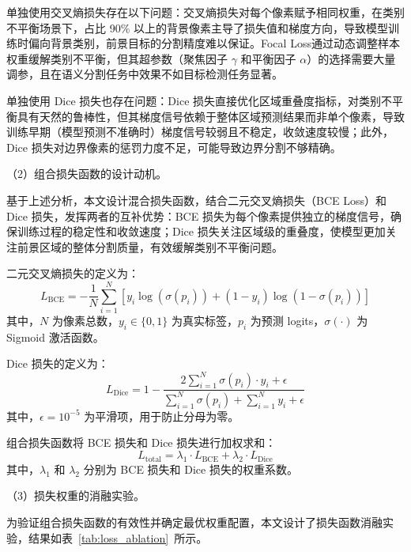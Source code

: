 单独使用交叉熵损失存在以下问题：交叉熵损失对每个像素赋予相同权重，在类别不平衡场景下，占比 90\% 以上的背景像素主导了损失值和梯度方向，导致模型训练时偏向背景类别，前景目标的分割精度难以保证。Focal Loss通过动态调整样本权重缓解类别不平衡，但其超参数（聚焦因子 $\gamma$ 和平衡因子 $\alpha$）的选择需要大量调参，且在语义分割任务中效果不如目标检测任务显著。

单独使用 Dice 损失也存在问题：Dice 损失直接优化区域重叠度指标，对类别不平衡具有天然的鲁棒性，但其梯度信号依赖于整体区域预测结果而非单个像素，导致训练早期（模型预测不准确时）梯度信号较弱且不稳定，收敛速度较慢；此外，Dice 损失对边界像素的惩罚力度不足，可能导致边界分割不够精确。

（2）组合损失函数的设计动机。

基于上述分析，本文设计混合损失函数，结合二元交叉熵损失（BCE Loss）和 Dice 损失，发挥两者的互补优势：BCE 损失为每个像素提供独立的梯度信号，确保训练过程的稳定性和收敛速度；Dice 损失关注区域级的重叠度，使模型更加关注前景区域的整体分割质量，有效缓解类别不平衡问题。

二元交叉熵损失的定义为：
\begin{equation}
L_{\text{BCE}} = -\frac{1}{N} \sum_{i=1}^{N} \left[ y_i \log(\sigma(p_i)) + (1-y_i) \log(1-\sigma(p_i)) \right]
\label{eq:bce_loss}
\end{equation}
其中，$N$ 为像素总数，$y_i \in \{0, 1\}$ 为真实标签，$p_i$ 为预测 logits，$\sigma(\cdot)$ 为 Sigmoid 激活函数。

Dice 损失的定义为：
\begin{equation}
L_{\text{Dice}} = 1 - \frac{2 \sum_{i=1}^{N} \sigma(p_i) \cdot y_i + \epsilon}{\sum_{i=1}^{N} \sigma(p_i) + \sum_{i=1}^{N} y_i + \epsilon}
\label{eq:dice_loss}
\end{equation}
其中，$\epsilon = 10^{-5}$ 为平滑项，用于防止分母为零。

组合损失函数将 BCE 损失和 Dice 损失进行加权求和：
\begin{equation}
L_{\text{total}} = \lambda_1 \cdot L_{\text{BCE}} + \lambda_2 \cdot L_{\text{Dice}}
\label{eq:total_loss}
\end{equation}
其中，$\lambda_1$ 和 $\lambda_2$ 分别为 BCE 损失和 Dice 损失的权重系数。

（3）损失权重的消融实验。

为验证组合损失函数的有效性并确定最优权重配置，本文设计了损失函数消融实验，结果如表~\ref{tab:loss_ablation}~所示。

